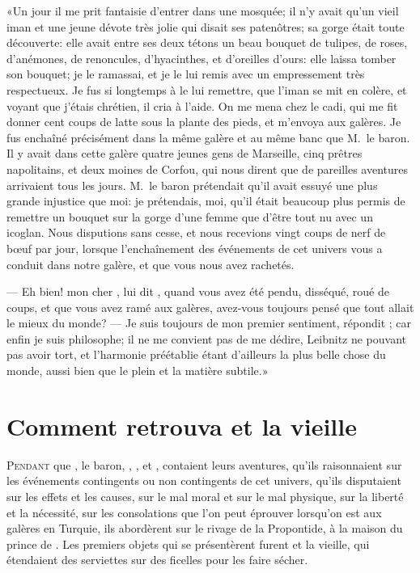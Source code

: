 «Un jour il me prit fantaisie d’entrer dans une mosquée; il n’y avait
qu’un vieil iman et une jeune dévote très jolie qui disait ses
patenôtres; sa gorge était toute découverte: elle avait entre ses deux
tétons un beau bouquet de tulipes, de roses, d’anémones, de renoncules,
d’hyacinthes, et d’oreilles d’ours: elle laissa tomber son 
bouquet; je
le ramassai, et je le lui remis avec un empressement très respectueux.
Je fus si longtemps à le lui remettre, que l’iman se mit en colère, et
voyant que j’étais chrétien, il cria à l’aide. On me mena chez le cadi,
qui me fit donner cent coups de latte sous la plante des pieds, et
m’envoya aux galères. Je fus enchaîné précisément dans la même galère
et au même banc que M.~le baron. Il y avait dans cette galère
quatre jeunes gens de Marseille, cinq prêtres napolitains, et deux
moines de Corfou, qui nous dirent que de pareilles aventures arrivaient
tous les jours. M.~le baron prétendait qu’il avait essuyé une
plus grande injustice que moi: je prétendais, moi, qu’il était beaucoup
plus permis de remettre un bouquet sur la gorge d’une femme que d’être
tout nu avec un icoglan. Nous disputions sans cesse, et nous recevions
vingt coups de nerf de bœuf par jour, lorsque l’enchaînement des
événements de cet univers vous a conduit dans notre galère, et que vous
nous avez rachetés.

— Eh bien! mon cher , lui dit , quand vous avez été pendu,
disséqué, roué de coups, et que vous avez ramé aux galères, avez-vous
toujours pensé que tout allait le mieux du monde? — Je suis toujours de
mon premier sentiment, répondit ; car enfin je suis philosophe;
il ne me convient pas de me dédire, Leibnitz ne pouvant pas avoir tort,
et l’harmonie préétablie étant d’ailleurs la plus belle chose du monde,
aussi bien que le plein et la matière subtile.»



\chapter{Comment  retrouva  et la vieille}


\lettrine{P}{endant} que , le baron, , , et , contaient
leurs aventures, qu’ils raisonnaient sur les événements contingents ou
non contingents de cet univers, qu’ils disputaient sur les effets et
les causes, sur le mal moral et sur le mal physique, sur la liberté et
la nécessité, sur les consolations que l’on peut éprouver lorsqu’on est
aux galères en Turquie, ils abordèrent sur le rivage de la Propontide,
à la maison du prince de . Les premiers objets qui se
présentèrent furent  et la vieille, qui étendaient des
serviettes sur des ficelles pour les faire sécher.

